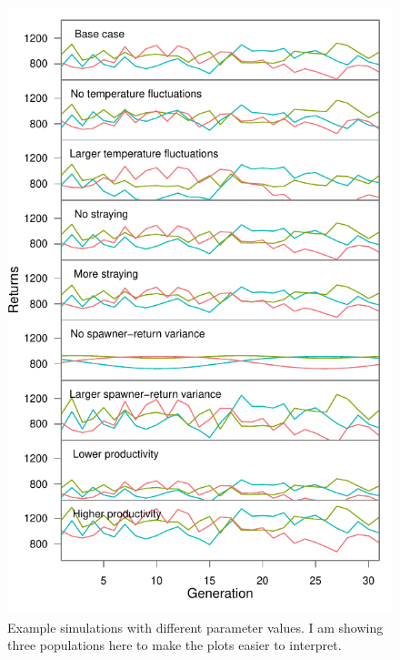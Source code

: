 \documentclass[12pt]{article}
\begin{document}
\begin{figure}[htbp]
\centering
\includegraphics{figure/plot-various-options-ts-3pops.pdf}
\caption{Example simulations with different parameter values. I am
showing three populations here to make the plots easier to
interpret.\label{fig:sim-param-ts-3}}
\end{figure}
\end{document}
